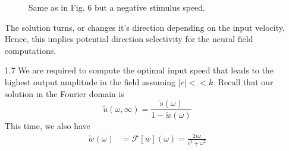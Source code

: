 \documentclass[12pt]{article}
\begin{document}
\begin{enumerate}
\begin{figure}[H]
    \caption{Same as in Fig. 6 but a negative stimulus speed.}
\end{figure}
The solution turns, or changes it's direction depending on the input velocity. Hence, this implies potential direction selectivity for the neural field computations. 
\item[1.7] We are required to compute the optimal input speed that leads to the highest output amplitude in the field assuming $|c| << k$.
Recall that our solution in the Fourier domain is
\[
    \widetilde{u}(\omega, \infty) = \frac{\widetilde{s}(\omega)}{1 - \widetilde{w}(\omega)}  
\] 
This time, we also have
\begin{align*}
    \widetilde{w}(\omega) &= \mathcal{F}[w](\omega) = \frac{2i\omega}{c^{2}+\omega^{2}}
\end{align*}
\end{enumerate}
\end{document}
